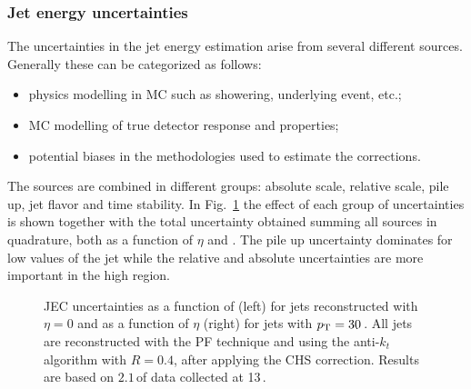 \subsubsection{Jet energy uncertainties}

The uncertainties in the jet energy estimation arise from several different sources. Generally these can be categorized as follows:
\begin{itemize}
\item physics modelling in MC such as showering, underlying event, etc.;
\item MC modelling of true detector response and properties;
\item potential biases in the methodologies used to estimate the corrections.
\end{itemize}
The sources are combined in different groups: absolute scale, relative scale, pile up, jet flavor and time stability. In Fig.~\ref{fig:JECunc} the effect of each group of uncertainties is shown together with the total uncertainty obtained summing all sources in quadrature, both as a function of $\eta$ and \pt. The pile up uncertainty dominates for low values of the jet \pt while the relative and absolute uncertainties are more important in the high \pt region.

\begin{figure}[htb]
\centering
{}
\caption{JEC uncertainties as a function of \pt (left) for jets reconstructed with $\eta=0$ and as a function of $\eta$ (right) for jets with $p_\mathrm{T}=30$\,\GeV. All jets are reconstructed with the PF technique and using the anti-$k_t$ algorithm with $R=0.4$, after applying the CHS correction. Results are based on $2.1$\,\ifb of data collected at 13\,\TeV.}\label{fig:JECunc}
\end{figure}

